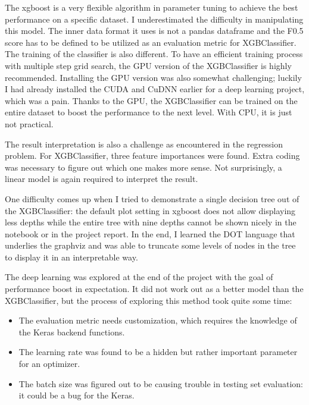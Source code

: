 \documentclass[a4paper]{article}
\begin{document}
			The xgboost is a very flexible algorithm in parameter tuning to achieve the best performance on a specific dataset. I underestimated the difficulty in manipulating this model. The inner data format it uses is not a pandas dataframe and the F0.5 score has to be defined to be utilized as an evaluation metric for XGBClassifier. The training of the classifier is also different. To have an efficient training process with multiple step grid search, the GPU version of the XGBClassifier is highly recommended. Installing the GPU version was also somewhat challenging; luckily I had already installed the CUDA and CuDNN earlier for a deep learning project, which was a pain. Thanks to the GPU, the XGBClassifier can be trained on the entire dataset to boost the performance to the next level. With CPU, it is just not practical.
			
			The result interpretation is also a challenge as encountered in the regression problem. For XGBClassifier, three feature importances were found. Extra coding was necessary to figure out which one makes more sense. Not surprisingly, a linear model is again required to interpret the result.
			
			One difficulty comes up when I tried to demonstrate a single decision tree out of the XGBClassifier: the default plot setting in xgboost does not allow displaying less depths while the entire tree with nine depths cannot be shown nicely in the notebook or in the project report. In the end, I learned the DOT language that underlies the graphviz and was able to truncate some levels of nodes in the tree to display it in an interpretable way.
			
			The deep learning was explored at the end of the project with the goal of performance boost in expectation. It did not work out as a better model than the XGBClassifier, but the process of exploring this method took quite some time:
			
			\begin{itemize}
				\item The evaluation metric needs customization, which requires the knowledge of the Keras backend functions.
				\item The learning rate was found to be a hidden but rather important parameter for an optimizer.
				\item The batch size was figured out to be causing trouble in testing set evaluation: it could be a bug for the Keras. 
			\end{itemize}   
			
\end{document}

